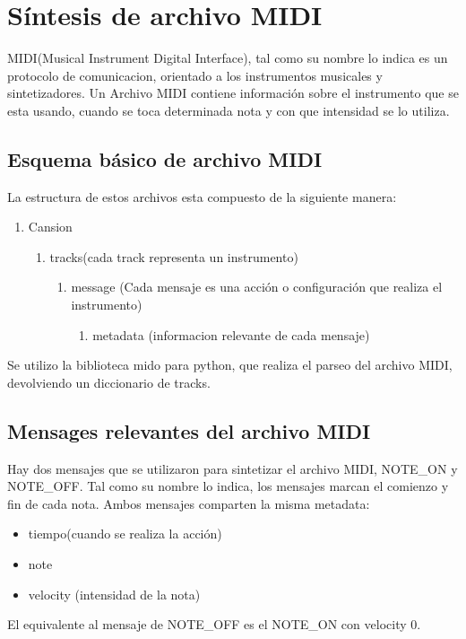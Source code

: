\documentclass[../ASSD_TP2.tex]{subfiles}
\begin{document}
\section*{Síntesis de archivo MIDI}
MIDI(Musical Instrument Digital Interface), tal como su nombre lo indica es un protocolo de comunicacion, orientado a los instrumentos musicales y sintetizadores. Un Archivo MIDI contiene información sobre el instrumento que se esta usando, cuando se toca determinada nota y con que intensidad se lo utiliza. 
\subsection*{Esquema básico de archivo MIDI}
La estructura de estos archivos esta compuesto de la siguiente manera:
\begin{enumerate}
\item Cansion
	\begin{enumerate}
		\item tracks(cada track representa un instrumento)
			\begin{enumerate}
				\item message (Cada mensaje es una acción o configuración que realiza el instrumento)
					\begin{enumerate}
						\item metadata (informacion relevante de cada mensaje)
					\end{enumerate}						
			\end{enumerate}
	\end{enumerate}
\end{enumerate}
Se utilizo la biblioteca mido para python, que realiza el parseo del archivo MIDI, devolviendo un diccionario de tracks.
\subsection*{Mensages relevantes del archivo MIDI}

Hay dos mensajes que se utilizaron para sintetizar el archivo MIDI, NOTE\_ON y NOTE\_OFF. Tal como su nombre lo indica, los mensajes marcan el comienzo y fin de cada nota. Ambos mensajes comparten la misma metadata:
\begin{itemize}
\item tiempo(cuando se realiza la acción)
\item note 
\item velocity (intensidad de la nota)

\end{itemize}
El equivalente al mensaje de NOTE\_OFF es el NOTE\_ON con velocity 0.
\end{document}

